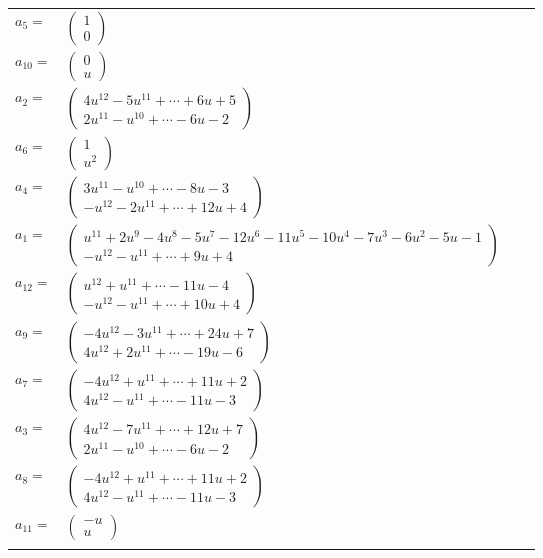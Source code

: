 \documentclass[1p]{elsarticle_modified}
\theoremstyle{definition}
\begin{document}
\begin{tabular}{m{7pt} m{180pt} m{7pt} m{180pt} }
\flushright $a_{5}=$&$\begin{pmatrix}1\\0\end{pmatrix}$ \\
\flushright $a_{10}=$&$\begin{pmatrix}0\\u\end{pmatrix}$ \\
\flushright $a_{2}=$&$\begin{pmatrix}4 u^{12}-5 u^{11}+\cdots+6 u+5\\2 u^{11}- u^{10}+\cdots-6 u-2\end{pmatrix}$ \\
\flushright $a_{6}=$&$\begin{pmatrix}1\\u^2\end{pmatrix}$ \\
\flushright $a_{4}=$&$\begin{pmatrix}3 u^{11}- u^{10}+\cdots-8 u-3\\- u^{12}-2 u^{11}+\cdots+12 u+4\end{pmatrix}$ \\
\flushright $a_{1}=$&$\begin{pmatrix}u^{11}+2 u^9-4 u^8-5 u^7-12 u^6-11 u^5-10 u^4-7 u^3-6 u^2-5 u-1\\- u^{12}- u^{11}+\cdots+9 u+4\end{pmatrix}$ \\
\flushright $a_{12}=$&$\begin{pmatrix}u^{12}+u^{11}+\cdots-11 u-4\\- u^{12}- u^{11}+\cdots+10 u+4\end{pmatrix}$ \\
\flushright $a_{9}=$&$\begin{pmatrix}-4 u^{12}-3 u^{11}+\cdots+24 u+7\\4 u^{12}+2 u^{11}+\cdots-19 u-6\end{pmatrix}$ \\
\flushright $a_{7}=$&$\begin{pmatrix}-4 u^{12}+u^{11}+\cdots+11 u+2\\4 u^{12}- u^{11}+\cdots-11 u-3\end{pmatrix}$ \\
\flushright $a_{3}=$&$\begin{pmatrix}4 u^{12}-7 u^{11}+\cdots+12 u+7\\2 u^{11}- u^{10}+\cdots-6 u-2\end{pmatrix}$ \\
\flushright $a_{8}=$&$\begin{pmatrix}-4 u^{12}+u^{11}+\cdots+11 u+2\\4 u^{12}- u^{11}+\cdots-11 u-3\end{pmatrix}$ \\
\flushright $a_{11}=$&$\begin{pmatrix}- u\\u\end{pmatrix}$\\&\end{tabular}
\end{document}
